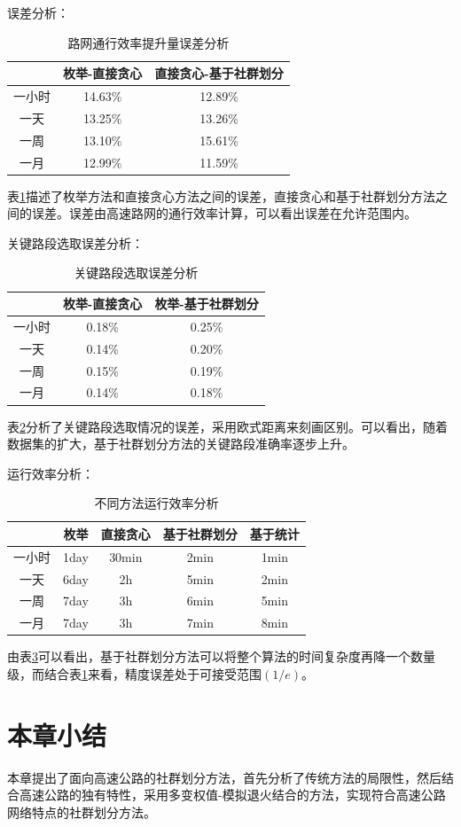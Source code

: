 		误差分析：

				\begin{table}[h]
				\centering
				\begin{tabular}{|c|c|c|}
				\hline
				\hline
				  &  枚举-直接贪心 &  直接贪心-基于社群划分 \\
				\hline
				 一小时 &  14.63\% &  12.89\% \\
				\hline
				 一天 &  13.25\% &  13.26\% \\
				\hline
				 一周 &  13.10\% &  15.61\% \\
				\hline
				 一月 &  12.99\% &  11.59\% \\
				\hline
				\end{tabular}
				\caption{路网通行效率提升量误差分析}
				\label{table1}
				\end{table} 

		表\ref{table1}描述了枚举方法和直接贪心方法之间的误差，直接贪心和基于社群划分方法之间的误差。误差由高速路网的通行效率计算，可以看出误差在允许范围内。

		关键路段选取误差分析：

				\begin{table}[h]
				\centering
				\begin{tabular}{|c|c|c|}
				\hline
				\hline
				   &   枚举-直接贪心 &   枚举-基于社群划分 \\
				\hline
				  一小时 &   0.18\% &   0.25\% \\
				\hline
				  一天 &   0.14\% &   0.20\% \\
				\hline
				  一周 &   0.15\% &   0.19\% \\
				\hline
				  一月 &   0.14\% &   0.18\% \\
				\hline
				\end{tabular}
				\caption{关键路段选取误差分析}
				\label{table2}
				\end{table} 

		表\ref{table2}分析了关键路段选取情况的误差，采用欧式距离来刻画区别。可以看出，随着数据集的扩大，基于社群划分方法的关键路段准确率逐步上升。

		运行效率分析：

				\begin{table}[h]
				\centering
				\begin{tabular}{|c|c|c|c|c|}
				\hline
				\hline
				   &   枚举 &   直接贪心 &   基于社群划分 &   基于统计 \\
				\hline
				  一小时 &   1day &   30min &   2min &   1min \\
				\hline
				  一天 &   6day &   2h &   5min &   2min \\
				\hline
				  一周 &  7day &   3h &   6min &   5min \\
				\hline
				  一月 &   7day &   3h &   7min &   8min \\
				\hline
				\end{tabular}
				\caption{不同方法运行效率分析}
				\label{table3}
				\end{table} 

		由表\ref{table3}可以看出，基于社群划分方法可以将整个算法的时间复杂度再降一个数量级，而结合表\ref{table1}来看，精度误差处于可接受范围$(1/e)$。

	\section{本章小结}
		本章提出了面向高速公路的社群划分方法，首先分析了传统方法的局限性，然后结合高速公路的独有特性，采用多变权值-模拟退火结合的方法，实现符合高速公路网络特点的社群划分方法。